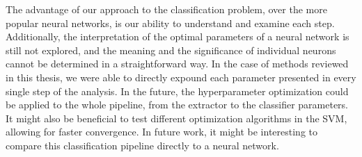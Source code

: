 The advantage of our approach to the classification problem, over the more popular neural networks, is our ability to understand and examine each step. Additionally, the interpretation of the optimal parameters of a neural network is still not explored, and the meaning and the significance of individual neurons cannot be determined in a straightforward way. In the case of methods reviewed in this thesis, we were able to directly expound each parameter presented in every single step of the analysis. In the future, the hyperparameter optimization could be applied to the whole pipeline, from the extractor to the classifier parameters. It might also be beneficial to test different optimization algorithms in the SVM, allowing for faster convergence. In future work, it might be interesting to compare this classification pipeline directly to a neural network.
